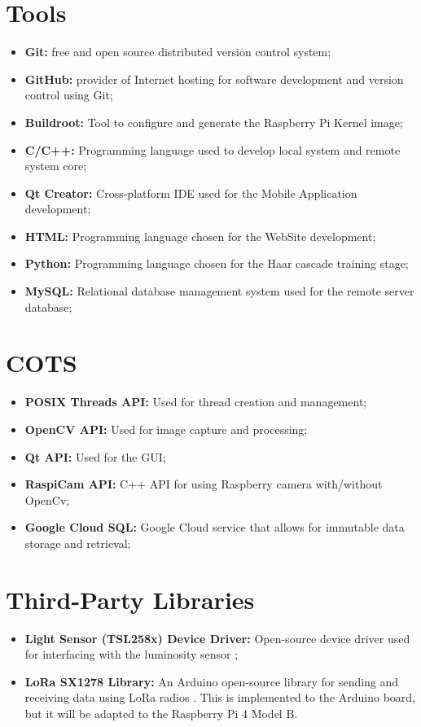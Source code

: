 \clearpage
\section{Tools}

\begin{itemize}
	\item \textbf{Git:} free and open source distributed version control system;
	\item \textbf{GitHub:} provider of Internet hosting for software development and version control using Git;
	\item \textbf{Buildroot:} Tool to configure and generate the Raspberry Pi Kernel image;
	\item \textbf{C/C++:} Programming language used to develop local system and remote system core;
	\item \textbf{Qt Creator:} Cross-platform IDE used for the Mobile Application development;
	\item \textbf{HTML:} Programming language chosen for the WebSite development;
	\item \textbf{Python:} Programming language chosen for the Haar cascade training stage;
	\item \textbf{MySQL:} Relational database management system used for the remote server database;
\end{itemize}

\section{COTS}

\begin{itemize}
	\item \textbf{POSIX Threads API:} Used for thread creation and management;
	\item \textbf{OpenCV API:} Used for image capture and processing;
	\item \textbf{Qt API:} Used for the GUI;
	\item \textbf{RaspiCam API:} C++ API for using Raspberry camera with/without OpenCv;
	\item \textbf{Google Cloud SQL:} Google Cloud service that allows for immutable data storage and retrieval;
\end{itemize}

\clearpage
\section{Third-Party Libraries}

\begin{itemize}
	\item \textbf{Light Sensor (TSL258x) Device Driver:} Open-source device driver used for interfacing with the luminosity sensor \cite{code_tsl};
	\item \textbf{LoRa SX1278 Library:} An Arduino open-source library for sending and receiving data using LoRa radios \cite{sx1278_lib}. This is implemented to the Arduino board, but it will be adapted to the Raspberry Pi 4 Model B.
\end{itemize}
